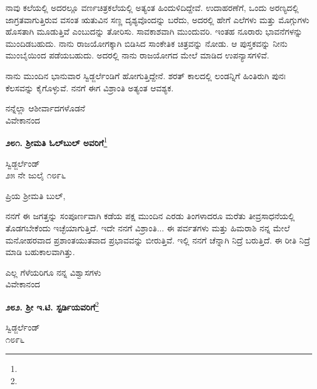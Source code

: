 \vspace{0.1cm}

ನಾವು ಕಲೆಯಲ್ಲಿ ಅದರಲ್ಲೂ ವರ್ಣಚಿತ್ರಕಲೆಯಲ್ಲಿ ಅತ್ಯಂತ ಹಿಂದುಳಿದಿದ್ದೇವೆ. ಉದಾಹರಣೆಗೆ, ಒಂದು ಅರಣ್ಯದಲ್ಲಿ ಜಾಗ್ರತವಾಗುತ್ತಿರುವ ವಸಂತ ಋತುವಿನ ಸಣ್ಣ ದೃಶ್ಯವೊಂದನ್ನು ಬರೆದು, ಅದರಲ್ಲಿ ಹೇಗೆ ಎಲೆಗಳು ಮತ್ತು ಮೊಗ್ಗುಗಳು ಹೊಸತಾಗಿ ಮೂಡುತ್ತಿವೆ ಎಂಬುದನ್ನು ತೋರಿಸು. ಸಾವಕಾಶವಾಗಿ ಮುಂದುವರಿ. ಇಂತಹ ನೂರಾರು ಭಾವನೆಗಳನ್ನು ಮುಂದಿಡಬಹುದು. ನಾನು ರಾಜಯೋಗಕ್ಕಾಗಿ ಬಿಡಿಸಿದ ಸಾಂಕೇತಿಕ ಚಿತ್ರವನ್ನು ನೋಡು. ಆ ಪುಸ್ತಕವನ್ನು ನೀನು ಮುಂಬೈಯಿಂದ ಪಡೆಯಬಹುದು. ಅದರಲ್ಲಿ ನಾನು ರಾಜಯೋಗದ ಮೇಲೆ ಮಾಡಿದ ಉಪನ್ಯಾಸಗಳಿವೆ.

\vspace{0.1cm}

ನಾನು ಮುಂದಿನ ಭಾನುವಾರ ಸ್ವಿಡ್ಜರ್ಲೆಂಡಿಗೆ ಹೋಗುತ್ತಿದ್ದೇನೆ. ಶರತ್ ಕಾಲದಲ್ಲಿ ಲಂಡನ್ನಿಗೆ ಹಿಂತಿರುಗಿ ಪುನಃ ಕೆಲಸವನ್ನು ಕೈಗೊಳ್ಳುವೆ. ನನಗೆ ಈಗ ವಿಶ್ರಾಂತಿ ಅತ್ಯಂತ ಆವಶ್ಯಕ.

{\flushright
ನನ್ನೆಲ್ಲಾ ಆಶೀರ್ವಾದಗಳೊಡನೆ\\ವಿವೇಕಾನಂದ\par}

\begin{center}
\textbf{೨೮೧. ಶ‍್ರೀಮತಿ ಓಲ್‌ಬುಲ್‌ ಅವರಿಗೆ}\footnote{}
\end{center}

\begin{flushright}
ಸ್ವಿಡ್ಜರ್ಲೆಂಡ್\\೨೫ ನೇ ಜುಲೈ ೧೮೯೬
\end{flushright}

\noindent
ಪ್ರಿಯ ಶ‍್ರೀಮತಿ ಬುಲ್,

ನನಗೆ ಈ ಜಗತ್ತನ್ನು ಸಂಪೂರ್ಣವಾಗಿ ಕಡೆಯ ಪಕ್ಷ ಮುಂದಿನ ಎರಡು ತಿಂಗಳಾದರೂ ಮರೆತು ತೀವ್ರಸಾಧನೆಯಲ್ಲಿ ತೊಡಗಬೇಕೆಂದು ಇಚ್ಛೆಯಾಗುತ್ತಿದೆ. ಇದೇ ನನಗೆ ವಿಶ್ರಾಂತಿ... ಈ ಪರ್ವತಗಳು ಮತ್ತು ಹಿಮರಾಶಿ ನನ್ನ ಮೇಲೆ ಮನೋಹರವಾದ ಪ್ರಶಾಂತಯುತವಾದ ಪ್ರಭಾವವನ್ನು ಬೀರುತ್ತಿವೆ. ಇಲ್ಲಿ ನನಗೆ ಚೆನ್ನಾಗಿ ನಿದ್ರೆ ಬರುತ್ತಿದೆ. ಈ ರೀತಿ ನಿದ್ರೆ ಮಾಡಿ ಬಹುಕಾಲವಾಗಿತ್ತು.

{\flushright
ಎಲ್ಲ ಗೆಳೆಯರಿಗೂ ನನ್ನ ವಿಶ್ವಾಸಗಳು\\ವಿವೇಕಾನಂದ\par}

\begin{center}
\textbf{೨೮೨. ಶ‍್ರೀ ಇ.ಟಿ. ಸ್ಟರ್ಡಿಯವರಿಗೆ}\footnote{}
\end{center}

\vspace{-0.5cm}

\begin{flushright}
ಸ್ವಿಡ್ಜರ್ಲೆಂಡ್\\೧೮೯೬
\end{flushright}

